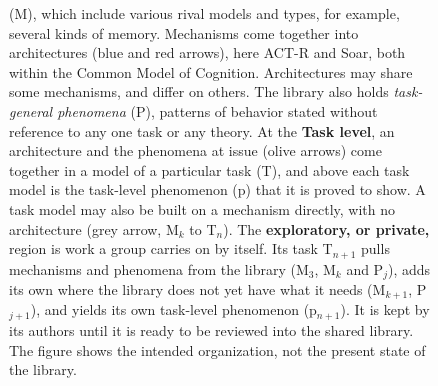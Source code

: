 \documentclass[11pt]{article}
\begin{document}
\begin{figure}[p]
{(M), which include various rival models and types, for example,
several kinds of memory. Mechanisms come together into architectures (blue and red arrows),
here ACT-R and Soar, both within the Common Model of Cognition.
Architectures may share some mechanisms, and differ on others. The
library also holds
\emph{task-general phenomena} (P), patterns of behavior stated without
reference to any one task or any theory. At the \textbf{Task level}, an
architecture and the phenomena at issue (olive arrows) come together in
a model of a particular task (T), and above each task model is the
task-level phenomenon (p) that it is proved to show. A task model may
also be built on a mechanism directly, with no architecture (grey
arrow, M$_k$ to T$_n$). The \textbf{exploratory, or private,} region is
work a group carries on by itself. Its task T$_{n+1}$ pulls mechanisms
and phenomena from the library (M$_3$, M$_k$ and P$_j$), adds its own
where the library does not yet have what it needs (M$_{k+1}$,
P$_{j+1}$), and yields its own task-level phenomenon (p$_{n+1}$). It is
kept by its authors until it is ready to be reviewed into the shared
library. The figure shows the intended organization, not the present
state of the library.}
\label{fig:arch}
\end{figure}
\clearpage



\end{document}
